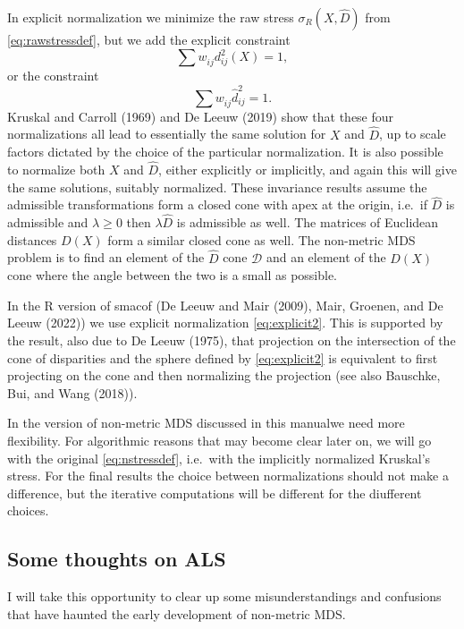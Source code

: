 \documentclass[
  12pt,
]{article}
\begin{document}
In explicit normalization we minimize the raw stress \(\sigma_R(X,\hat D)\)
from \eqref{eq:rawstressdef}, but we add the explicit constraint
\begin{equation}
\sum   w_{ij}^{\ }d_{ij}^2(X)=1,
\label{eq:explicit1}
\end{equation}
or the constraint
\begin{equation}
\sum   w_{ij}^{\ }\hat d_{ij}^2=1.
\label{eq:explicit2}
\end{equation}
Kruskal and Carroll (1969) and De Leeuw (2019) show that these
four normalizations all lead to essentially the same solution for \(X\)
and \(\hat D\), up to scale factors dictated by the choice of the particular
normalization. It is also possible to normalize both \(X\) and \(\hat D\),
either explicitly or implicitly, and again this will give the same
solutions, suitably normalized. These invariance results assume the
admissible transformations form a closed cone with apex at the origin,
i.e.~if \(\hat D\) is admissible and \(\lambda\geq 0\) then \(\lambda\hat D\)
is admissible as well. The matrices of Euclidean distances \(D(X)\) form a
similar closed cone as well. The non-metric MDS problem is to find an element
of the \(\hat D\) cone \(\mathcal{D}\) and an element of the \(D(X)\) cone where the angle between the two is a small as possible.

In the R version of smacof (De Leeuw and Mair (2009),
Mair, Groenen, and De Leeuw (2022)) we use explicit normalization
\eqref{eq:explicit2}. This is supported by the result, also due to
De Leeuw (1975), that projection on the intersection of the cone of
disparities and the sphere defined by \eqref{eq:explicit2} is equivalent
to first projecting on the cone and then normalizing the projection (see
also Bauschke, Bui, and Wang (2018)).

In the version of non-metric MDS discussed in this manualwe need more flexibility. For algorithmic reasons that may become clear later on, we will go with the original \eqref{eq:nstressdef}, i.e.~with the implicitly normalized
Kruskal's stress. For the final results the choice between normalizations should not make a difference, but the iterative computations will be different for the
diufferent choices.

\subsection{Some thoughts on ALS}\label{some-thoughts-on-als}

I will take this opportunity to clear up some misunderstandings and
confusions that have haunted the early development of non-metric MDS.
\end{document}
